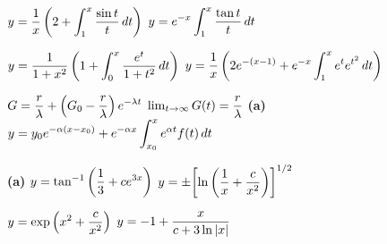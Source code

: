    $\displaystyle{y=\frac{1}{x}\left(2+\int^{x}_{1}\frac{\sin t}{t}\,dt\right)}$
   $\displaystyle{y=e^{-x}
\int^{x}_{1}\frac{\tan t}{t}\,dt}$

$\displaystyle{y=\frac{1}{1+x^{2}}\left(1+\int^{x}_{0}
\frac{e^{t}}{1+t^{2}}\,dt\right)}$
$\displaystyle{y=\frac{1}{x}\left(2e^{-(x-1)}+e^{-x}
\int_{1}^{x}e^{t}e^{t^{2}}\,dt\right)}$

$G=\displaystyle{\frac{r}{\lambda}+\left(G_{0}-\frac{r}{\lambda}\right)e^{-\lambda
t}}$\; $\lim_{t\to\infty}G(t)=\displaystyle\frac{r}{\lambda}$
{\bf  (a)}  $\displaystyle{y=y_{0}e^{-\alpha(x-x_{0})}+e^{-\alpha x}
\int^{x}_{x_{0}}e^{\alpha t}f(t)\,dt}$

{\bf  (a)} $\displaystyle{y=\tan^{-1}\left(\frac{1}{3}+ce^{3x}\right)}$
$y=\pm\displaystyle{\left[\ln\left(\displaystyle\frac{1}{x}+\displaystyle\frac{c}{x^{2}}\right)\right]^{1/2}}$

\quad {} $\displaystyle{y=\exp\left(x^{2}+\frac{c}{x^{2}}\right)}$
 $\displaystyle{y=-1+\frac{x}{c+3\ln|x|}}$


